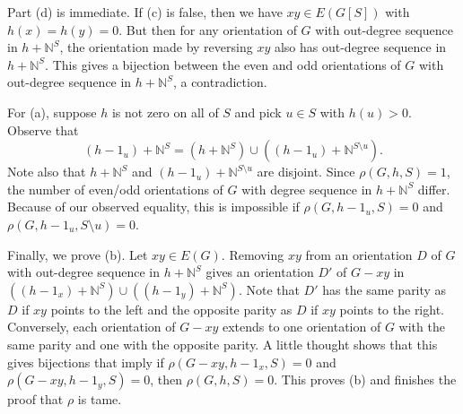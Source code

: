 \documentclass[12pt]{article}
\theoremstyle{plain}
\theoremstyle{definition}
\theoremstyle{remark}
\newcommand{\IN}{\mathbb{N}}
\begin{document}
Part (d) is immediate.  If (c) is false, then we have $xy \in E(G[S])$ with $h(x) = h(y) = 0$.  But then for any orientation of $G$ with out-degree sequence in $h + \IN^S$, the orientation made by reversing $xy$ also has out-degree sequence in $h + \IN^S$.  This gives a bijection between the even and odd orientations of $G$ with out-degree sequence in $h + \IN^S$, a contradiction.

For (a), suppose $h$ is not zero on all of $S$ and pick $u \in S$ with $h(u) > 0$.  Observe that 
\[(h - 1_u) + \IN^S = (h + \IN^S) \cup ((h - 1_u) + \IN^{S \setminus u}).\]
Note also that $h + \IN^S$ and $(h - 1_u) + \IN^{S \setminus u}$ are disjoint.  Since $\rho(G, h, S) = 1$, the number of even/odd orientations of $G$ with degree sequence in $h + \IN^S$ differ.  Because of our observed equality, this is impossible if $\rho(G, h - 1_u, S) = 0$ and $\rho(G, h - 1_u, S \setminus u) = 0$. 

Finally, we prove (b).  Let $xy \in E(G)$.  Removing $xy$ from an orientation $D$ of $G$ with out-degree sequence in $h + \IN^S$ gives an orientation $D'$ of $G-xy$ in $((h - 1_x) + \IN^S) \cup ((h - 1_y) + \IN^S)$.  Note that $D'$ has the same parity as $D$ if $xy$ points to the left and the opposite parity as $D$ if $xy$ points to the right.  Conversely, each orientation of $G-xy$ extends to one orientation of $G$ with the same parity and one with the opposite parity.  A little thought shows that this gives bijections that imply if $\rho(G-xy, h - 1_x, S) = 0$ and $\rho(G-xy, h - 1_y, S) = 0$, then $\rho(G, h, S) = 0$.  This proves (b) and finishes the proof that $\rho$ is tame.


\end{document}
